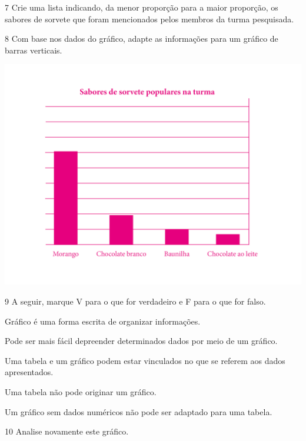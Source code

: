 \num{7} Crie uma lista indicando, da menor proporção para a maior proporção, os sabores de sorvete que foram mencionados pelos membros da turma pesquisada.


\num{8} Com base nos dados do gráfico, adapte as informações para um gráfico de barras verticais.

\begin{mdframed}[linewidth=2pt,linecolor=salmao]
\centering\includegraphics[width=.8\textwidth]{../ilustracoes/POR5/SAEB_5ANO_POR_FIGURA4.png}
\end{mdframed}

\pagebreak
\num{9} A seguir, marque V para o que for verdadeiro e F para o que for falso.

\begin{boxlist}
 Gráfico é uma forma escrita de organizar informações.

 Pode ser mais fácil depreender determinados dados por meio de um gráfico.

 Uma tabela e um gráfico podem estar vinculados no que se referem aos dados apresentados.

 Uma tabela não pode originar um gráfico.

 Um gráfico sem dados numéricos não pode ser adaptado para uma tabela.
\end{boxlist}

\num{10} Analise novamente este gráfico.

